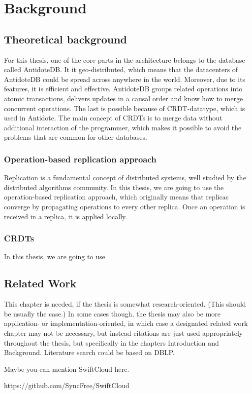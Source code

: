 \chapter{Background}
\label{Background}

\section{Theoretical background}

For this thesis, one of the core parts in the architecture belongs to the database called AntidoteDB\cite{antidote-website}. It it geo-distributed, which means that the datacenters of AntidoteDB could be spread across anywhere in the world. Moreover, due to its features, it is efficient and effective. AntidoteDB groups related operations into atomic transactions, delivers updates in a causal order and know how to merge concurrent operations. The last is possible because of CRDT-datatype, which is used in Antidote. The main concept of CRDTs is to merge data without additional interaction of the programmer, which makes it possible to avoid the problems that are common for other databases. 

\subsection{Operation-based replication approach}

Replication is a fundamental concept of distributed systems, well studied by the distributed algorithms community\cite{Shapiro2011}. In this thesis, we are going to use the operation-based replication approach, which originally means that replicas converge by propagating operations to every other replica\cite{Preguica2018}. Once an operation is received in a replica, it is applied locally. 

\subsection{CRDTs}

In this thesis, we are going to use 



\section{Related Work}

This chapter is needed, if the thesis is somewhat research-oriented. (This should be usually the case.) In some cases though, the thesis may also be more application- or implementation-oriented, in which case a designated related work chapter may not be necessary, but instead citations are just used appropriately throughout the thesis, but specifically in the chapters Introduction and Background. Literature search could be based on DBLP.

Maybe you can mention SwiftCloud here.

https://github.com/SyncFree/SwiftCloud